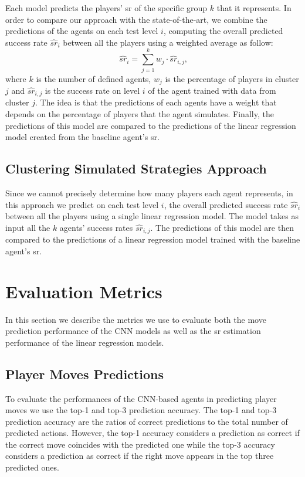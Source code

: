 Each model predicts the players' \acs{sr} of the specific group $k$ that it represents. In order to compare our approach with the state-of-the-art, we combine the predictions of the agents on each test level $i$, computing the overall predicted success rate $\widehat{sr}_i$ between all the players using a weighted average as follow:
\begin{equation}\label{combination}
    \widehat{sr}_i = \sum_{j = 1}^{k} w_j \cdot \widehat{sr}_{i,j} \text{,}
\end{equation}
where $k$ is the number of defined agents, $w_j$ is the percentage of players in cluster $j$ and $\widehat{sr}_{i,j}$ is the success rate on level $i$ of the agent trained with data from cluster $j$.
The idea is that the predictions of each agents have a weight that depends on the percentage of players that the agent simulates.
Finally, the predictions of this model are compared to the predictions of the linear regression model created from the baseline agent's \acs{sr}.

\subsection{Clustering Simulated Strategies Approach}

Since we cannot precisely determine how many players each agent represents, in this approach we predict on each test level $i$, the overall predicted success rate $\widehat{sr}_i$ between all the players using a single linear regression model. The model takes as input all the $k$ agents' success rates $\widehat{sr}_{i,j}$. The predictions of this model are then compared to the predictions of a linear regression model trained with the baseline agent's \acs{sr}. 


\section{Evaluation Metrics}

In this section we describe the metrics we use to evaluate both the move prediction performance of the \acs{CNN} models as well as the \acs{sr} estimation performance of the linear regression models.

\subsection{Player Moves Predictions}
To evaluate the performances of the \acs{CNN}-based agents in predicting player moves we use the top-1 and top-3 prediction accuracy. The top-1 and top-3 prediction accuracy are the ratios of correct predictions to the total number of predicted actions. However, the top-1 accuracy considers a prediction as correct if the correct move coincides with the predicted one while the top-3 accuracy considers a prediction as correct if the right move appears in the top three predicted ones.

